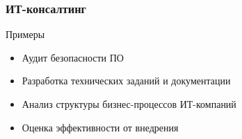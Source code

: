 \documentclass{../industrial-development}
\begin{document}
\begin{frame} \frametitle{ИТ-консалтинг}
	\begin{block}{Примеры}
		\begin{itemize}
			\item Аудит безопасности ПО
			\item Разработка технических заданий и документации
			\item Анализ структуры бизнес-процессов ИТ-компаний
			\item Оценка эффективности от внедрения
		\end{itemize}
	\end{block}
\end{frame}
\lecturenotes


%  


\end{document}
